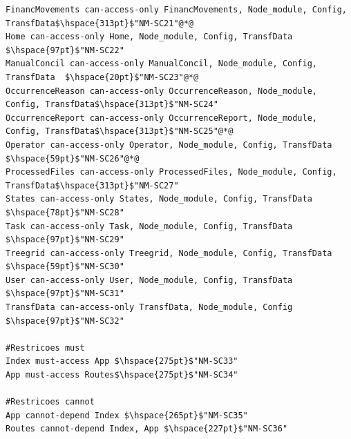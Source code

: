 \documentclass[12pt]{article}
\begin{document}
\begin{lstlisting}[style=colorido, caption={Especificação do Projeto Arquitetural do orquestrador Node-Middle.},label={list:especArquiteturalNodeMiddle}
]
FinancMovements can-access-only FinancMovements, Node_module, Config, TransfData$\hspace{313pt}$"NM-SC21"@*@
Home can-access-only Home, Node_module, Config, TransfData $\hspace{97pt}$"NM-SC22"
ManualConcil can-access-only ManualConcil, Node_module, Config, TransfData	$\hspace{20pt}$"NM-SC23"@*@
OccurrenceReason can-access-only OccurrenceReason, Node_module, Config, TransfData$\hspace{313pt}$"NM-SC24"
OccurrenceReport can-access-only OccurrenceReport, Node_module, Config, TransfData$\hspace{313pt}$"NM-SC25"@*@
Operator can-access-only Operator, Node_module, Config, TransfData	$\hspace{59pt}$"NM-SC26"@*@
ProcessedFiles can-access-only ProcessedFiles, Node_module, Config, TransfData$\hspace{313pt}$"NM-SC27"
States can-access-only States, Node_module, Config, TransfData	$\hspace{78pt}$"NM-SC28"
Task can-access-only Task, Node_module, Config, TransfData $\hspace{97pt}$"NM-SC29"
Treegrid can-access-only Treegrid, Node_module, Config, TransfData	$\hspace{59pt}$"NM-SC30"
User can-access-only User, Node_module, Config, TransfData $\hspace{97pt}$"NM-SC31"
TransfData can-access-only TransfData, Node_module, Config $\hspace{97pt}$"NM-SC32"

#Restricoes must
Index must-access App $\hspace{275pt}$"NM-SC33"
App must-access Routes$\hspace{275pt}$"NM-SC34"

#Restricoes cannot
App cannot-depend Index	$\hspace{265pt}$"NM-SC35"
Routes cannot-depend Index, App	$\hspace{227pt}$"NM-SC36"

\end{lstlisting}
\end{document}
